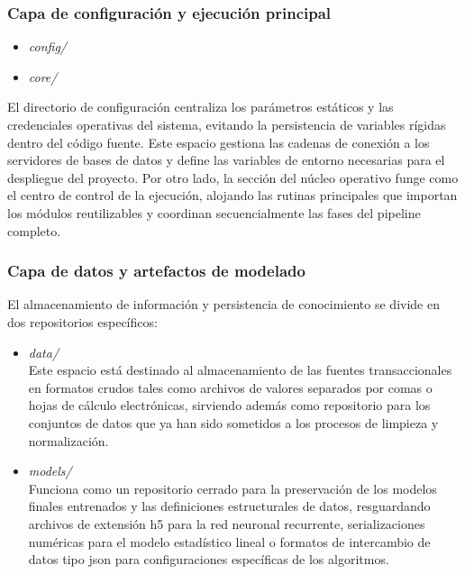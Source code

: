 \documentclass[11pt,a4paper]{report}
\begin{document}
    \subsubsection{Capa de configuración y ejecución principal}
    \begin{itemize}
        \item \textit{config/}
        \item \textit{core/}
    \end{itemize}
    El directorio de configuración centraliza los parámetros estáticos y las credenciales operativas del sistema,
    evitando la persistencia de variables rígidas dentro del código fuente. Este espacio gestiona las cadenas de
    conexión a los servidores de bases de datos y define las variables de entorno necesarias para el despliegue del proyecto.
    Por otro lado, la sección del núcleo operativo funge como el centro de control de la ejecución,
    alojando las rutinas principales que importan los módulos reutilizables y coordinan secuencialmente las fases del pipeline completo.

    \subsubsection{Capa de datos y artefactos de modelado}
    El almacenamiento de información y persistencia de conocimiento se divide en dos repositorios específicos:
    \begin{itemize}
        \item \textit{data/}\\
        Este espacio está destinado al almacenamiento de las fuentes transaccionales en
        formatos crudos tales como archivos de valores separados por comas o hojas de cálculo electrónicas,
        sirviendo además como repositorio para los conjuntos de datos que ya han sido sometidos a
        los procesos de limpieza y normalización.

        \item \textit{models/}\\
        Funciona como un repositorio cerrado para la preservación de los
        modelos finales entrenados y las definiciones estructurales de datos,
        resguardando archivos de extensión h5 para la red neuronal recurrente,
        serializaciones numéricas para el modelo estadístico lineal o formatos de intercambio de datos tipo
        json para configuraciones específicas de los algoritmos.
    \end{itemize}
\end{document}
